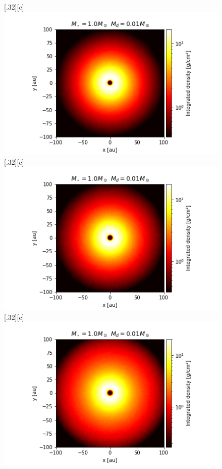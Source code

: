 \documentclass[aps,prb,twocolumn,superscriptaddress,floatfix,longbibliography]{revtex4-2}
\begin{document}
\begin{appendices}
\begin{figure}[!htbp]\vspace*{3cm}
  \centering
  \subcaptionbox*{}[.32\linewidth][c]{%
    \includegraphics[width=\linewidth]{Graphs_2D/r_1s_0.01d_0.3q_2D.png}}\quad
  \subcaptionbox*{}[.32\linewidth][c]{%
    \includegraphics[width=\linewidth]{Graphs_2D/r_1s_0.01d_0.5q_2D.png}}\quad
  \subcaptionbox*{}[.32\linewidth][c]{%
    \includegraphics[width=\linewidth]{Graphs_2D/r_1s_0.01d_0.7q_2D.png}}\quad

\end{figure}
\end{appendices}
\end{document}
